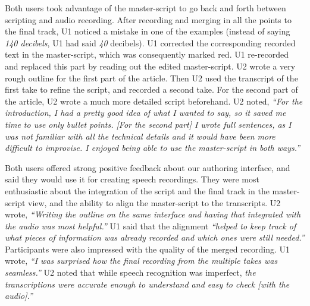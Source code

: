 Both users took advantage of the master-script to go back and forth between scripting and audio recording. After recording and merging in all the points
to the final track, U1 noticed a mistake in one of the examples
(instead of saying \textit{140 decibels}, U1 had said \textit{40}
decibels). U1 corrected the corresponding recorded text in the
master-script, which was consequently marked red. U1 re-recorded
and replaced this part by reading out the edited master-script.
U2 wrote a very rough outline for the first part of the article. Then U2 used the transcript of the first take to refine the script, and recorded a second take. For the second part of the article, U2 wrote a much more detailed script beforehand. U2 noted,  \textit{``For the introduction, I had a pretty good idea of what I wanted to say, so it saved me time to use only bullet points. [For the second part] I wrote full sentences, as I was not familiar with all the technical details and it would have been more difficult
to improvise. I enjoyed being able to use the master-script in both ways.''
}


Both users offered strong positive feedback about our authoring
interface, and said they would use it for creating speech recordings. They were most enthusiastic about the integration
of the script and the final track in the master-script view,
and the ability to align the master-script to the transcripts.
U2 wrote, \textit{``Writing the outline on the same interface and having
that integrated with the audio was most helpful.''}  U1 said
that the alignment \textit{``helped to keep track of what pieces
of information was already recorded and which ones were still
needed.''} Participants were also impressed with the quality
of the merged recording. U1 wrote, \textit{``I was surprised
how the final recording from the multiple takes was seamless.''} U2 noted that while speech recognition was imperfect, \textit{the transcriptions were accurate enough to understand and easy to check [with the audio].''}

